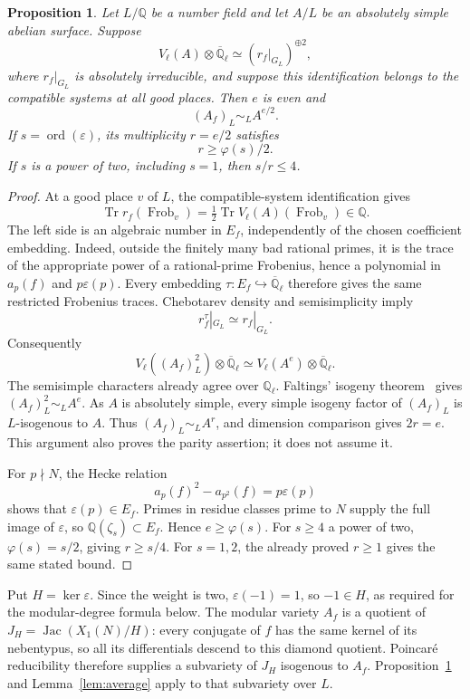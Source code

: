 \documentclass[11pt,a4paper]{article}
\newtheorem{proposition}[theorem]{Proposition}
\newcommand{\Q}{\mathbb Q}
\DeclareMathOperator{\Tr}{Tr}
\DeclareMathOperator{\ord}{ord}
\begin{document}
\begin{proposition}\label{prop:multiplicity}
Let \(L/\Q\) be a number field and let \(A/L\) be an absolutely
simple abelian surface. Suppose
\[
 V_\ell(A)\otimes\overline{\Q}_\ell
       \simeq (r_f|_{G_L})^{\oplus2},
\]
where \(r_f|_{G_L}\) is absolutely irreducible, and suppose this
identification belongs to the compatible systems at all good places.
Then \(e\) is even and
\[
                         (A_f)_L\sim_L A^{e/2}.
\]
If \(s=\ord(\varepsilon)\), its multiplicity \(r=e/2\) satisfies
\[
                     r\ge \varphi(s)/2.
\]
If \(s\) is a power of two, including \(s=1\), then \(s/r\le4\).
\end{proposition}
\begin{proof}
At a good place \(v\) of \(L\), the compatible-system identification gives
\[
 \Tr r_f(\operatorname{Frob}_v)
       =\tfrac12\Tr V_\ell(A)(\operatorname{Frob}_v)\in\Q.
\]
The left side is an algebraic number in \(E_f\), independently of
the chosen coefficient embedding. Indeed, outside the finitely
many bad rational primes, it is the trace of the appropriate
power of a rational-prime Frobenius, hence a polynomial in
\(a_p(f)\) and \(p\varepsilon(p)\).
Every embedding \(\tau:E_f\hookrightarrow\overline{\Q}_\ell\)
therefore gives the same restricted Frobenius traces.
Chebotarev density and semisimplicity imply
\[
                         r_f^\tau|_{G_L}\simeq r_f|_{G_L}.
\]
Consequently
\[
 V_\ell((A_f)_L^2)\otimes\overline{\Q}_\ell
       \simeq V_\ell(A^e)\otimes\overline{\Q}_\ell.
\]
The semisimple characters already agree over \(\Q_\ell\).
Faltings' isogeny theorem~\cite{Faltings} gives \((A_f)_L^2\sim_L A^e\).
As \(A\) is absolutely simple, every simple isogeny factor of
\((A_f)_L\) is \(L\)-isogenous to \(A\).
Thus \((A_f)_L\sim_L A^r\), and dimension comparison gives \(2r=e\).
This argument also proves the parity assertion; it does not assume it.

For \(p\nmid N\), the Hecke relation
\[
                  a_p(f)^2-a_{p^2}(f)=p\varepsilon(p)
\]
shows that \(\varepsilon(p)\in E_f\). Primes in residue classes
prime to \(N\) supply the full image of \(\varepsilon\), so
\(\Q(\zeta_s)\subset E_f\). Hence \(e\ge\varphi(s)\).
For \(s\ge4\) a power of two, \(\varphi(s)=s/2\), giving
\(r\ge s/4\). For \(s=1,2\), the already proved \(r\ge1\)
gives the same stated bound.
\end{proof}

Put \(H=\ker\varepsilon\). Since the weight is two,
$\varepsilon(-1)=1$, so $-1\in H$, as required for the modular-degree
formula below. The modular variety \(A_f\) is a
quotient of \(J_H=\operatorname{Jac}(X_1(N)/H)\): every conjugate
of \(f\) has the same kernel of its nebentypus, so all its
differentials descend to this diamond quotient. Poincar\'e
reducibility therefore supplies a subvariety of \(J_H\) isogenous
to \(A_f\). Proposition~\ref{prop:multiplicity} and
Lemma~\ref{lem:average} apply to that subvariety over \(L\).
\end{document}
